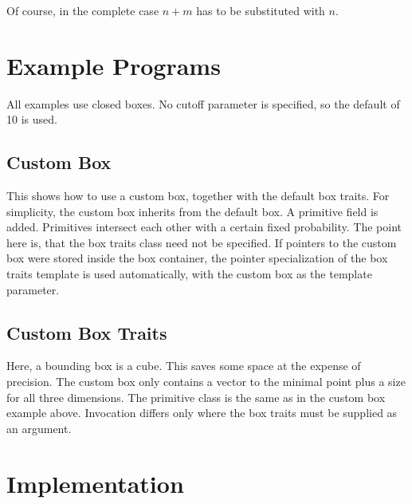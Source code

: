 {Of course, in the complete case $n+m$ has to be substituted with $n$.

\section{Example Programs}

All examples use closed boxes. No cutoff parameter is specified, so
the default of 10 is used.

\subsection{Custom Box}

This shows how to use a custom box, together with the default box
traits. For simplicity, the custom box inherits from the default box.
A primitive field is added. Primitives intersect each other with a
certain fixed probability. The point here is, that the box traits
class need not be specified. If pointers to the custom box were stored
inside the box container, the pointer specialization of the box traits
template is used automatically, with the custom box as the template
parameter.


\subsection{Custom Box Traits }

Here, a bounding box is a cube. This saves some space at the expense
of precision. The custom box only contains a vector to the minimal
point plus a size for all three dimensions. The primitive class is the
same as in the custom box example above. Invocation differs only where
the box traits must be supplied as an argument.


\section{Implementation}

}
